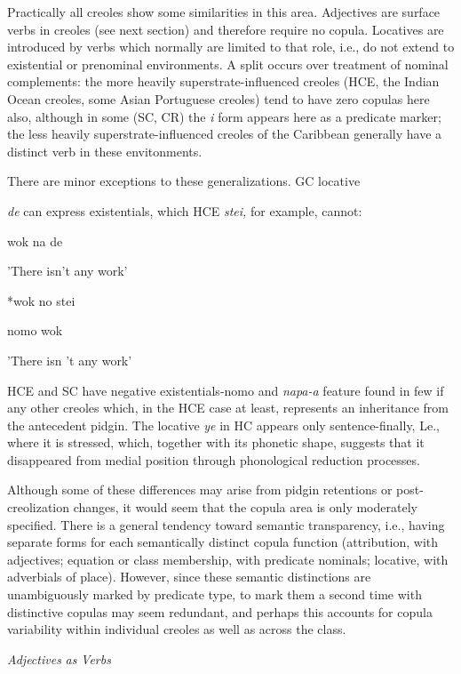 Practically all creoles show some similarities in this area. Adjec\-tives are surface verbs in creoles (see next section) and therefore require no copula. Locatives are introduced by verbs which normally are limited to that role, i.e., do not extend to existential or prenominal environments. A split occurs over treatment of nominal complements: the more heavily superstrate-influenced creoles (HCE, the Indian Ocean creoles, some Asian Portuguese creoles) tend to have zero copulas here also, although in some (SC, CR) the \textit{i} form appears here as a predicate marker; the less heavily superstrate-influenced creoles of the Caribbean generally have a distinct verb in these envitonments.

There are minor exceptions to these generalizations. GC locative

\textit{de }can express existentials, which HCE \textit{stei, }for example, cannot:

\ea\label{ex:60}
 wok na de
\glt
\z

'There isn't any work'

\ea\label{ex:61}
 *wok no stei
\glt
\z

\ea\label{ex:62}
 nomo wok
\glt
\z

'There isn 't any work'

HCE and SC have negative existentials-nomo and \textit{napa-a} feature found in few if any other creoles which, in the HCE case at least, represents an inheritance from the antecedent pidgin. The locative \textit{ye} in HC appears only sentence-finally, Le., where it is stressed, which, together with its phonetic shape, suggests that it disappeared from medial position through phonological reduction processes.


Although some of these differences may arise from pidgin retentions or post-creolization changes, it would seem that the copula area is only moderately specified. There is a general tendency toward semantic transparency, i.e., having separate forms for each semantically distinct copula function (attribution, with adjectives; equation or class membership, with predicate nominals; locative, with adverbials of place). However, since these semantic distinctions are unambiguously marked by predicate type, to mark them a second time with distinc\-tive copulas may seem redundant, and perhaps this accounts for copula variability within individual creoles as well as across the class.

\textit{Adjectives} \textit{as} \textit{Verbs}

